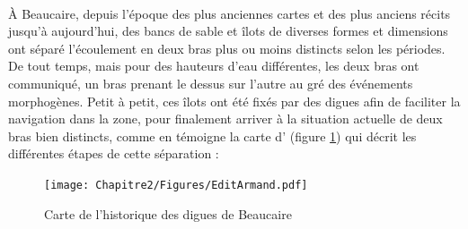         \paragraph{} À Beaucaire, depuis l'époque des plus anciennes cartes et des plus anciens récits jusqu'à aujourd'hui, des bancs de sable et îlots de diverses formes et dimensions ont séparé l'écoulement en deux bras plus ou moins distincts selon les périodes. De tout temps, mais pour des hauteurs d'eau différentes, les deux bras ont communiqué, un bras prenant le dessus sur l'autre au gré des événements morphogènes. Petit à petit, ces îlots ont été fixés par des digues afin de faciliter la navigation dans la zone, pour finalement arriver à la situation actuelle de deux bras bien distincts, comme en témoigne la carte d'\citet{armand_ii_1907} (figure \ref{fig:DigArmand}) qui décrit les différentes étapes de cette séparation :
        
         \begin{figure}[h]
            \centering
            \texttt{[image: Chapitre2/Figures/EditArmand.pdf]}
            \caption{Carte de l'historique des digues de Beaucaire \citep{armand_ii_1907}}
            \label{fig:DigArmand}
        \end{figure}
        
